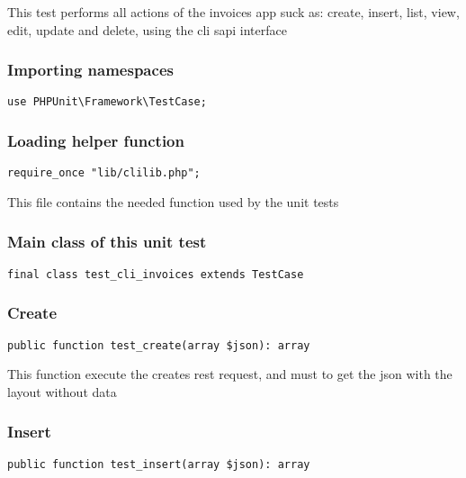 \documentclass[a4paper]{article}
\begin{document}
This test performs all actions of the invoices app suck as: create, insert,
list, view, edit, update and delete, using the cli sapi interface

\hypertarget{toc21}{}
\subsubsection{Importing namespaces}

\begin{lstlisting}
use PHPUnit\Framework\TestCase;
\end{lstlisting}

\hypertarget{toc22}{}
\subsubsection{Loading helper function}

\begin{lstlisting}
require_once "lib/clilib.php";
\end{lstlisting}

This file contains the needed function used by the unit tests

\hypertarget{toc23}{}
\subsubsection{Main class of this unit test}

\begin{lstlisting}
final class test_cli_invoices extends TestCase
\end{lstlisting}

\hypertarget{toc24}{}
\subsubsection{Create}

\begin{lstlisting}
public function test_create(array $json): array
\end{lstlisting}

This function execute the creates rest request, and must to get the
json with the layout without data

\hypertarget{toc25}{}
\subsubsection{Insert}

\begin{lstlisting}
public function test_insert(array $json): array
\end{lstlisting}
\end{document}
